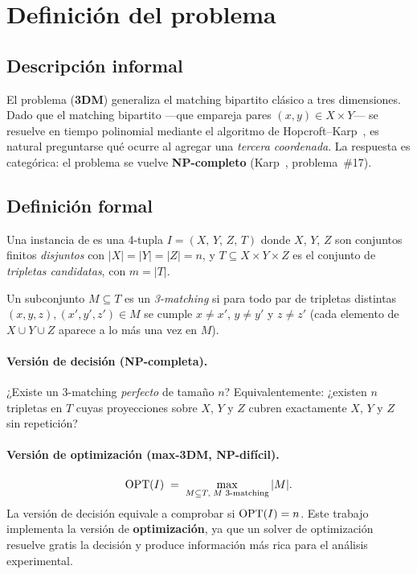 \section{Definición del problema}
\label{sec:problema}

\subsection{Descripción informal}
\label{sec:problema:informal}

El problema \threedm{} (\textbf{3DM}) generaliza el matching bipartito clásico
a tres dimensiones.  Dado que el matching bipartito ---que empareja pares
$(x,y)\in X\times Y$--- se resuelve en tiempo polinomial mediante el algoritmo
de Hopcroft--Karp~\cite{hopcroft1973}, es natural preguntarse qu\'e ocurre al
agregar una \emph{tercera coordenada}.  La respuesta es categ\'orica: el
problema se vuelve \textbf{NP-completo} (Karp~\cite{karp1972}, problema~\#17).

\subsection{Definición formal}
\label{sec:problema:formal}

\begin{definition}[Instancia de 3DM]
Una instancia de \threedm{} es una 4-tupla
$I = (X,\,Y,\,Z,\,T)$
donde $X$, $Y$, $Z$ son conjuntos finitos \emph{disjuntos} con
$|X|=|Y|=|Z|=n$, y
$T \subseteq X\times Y\times Z$ es el conjunto de \emph{tripletas candidatas},
con $m = |T|$.
\end{definition}

\begin{definition}[3-matching]
Un subconjunto $M\subseteq T$ es un \emph{3-matching} si para todo par de
tripletas distintas $(x,y,z),(x',y',z')\in M$ se cumple
$x\neq x'$, $y\neq y'$ y $z\neq z'$
(cada elemento de $X\cup Y\cup Z$ aparece a lo más una vez en $M$).
\end{definition}

\paragraph{Versión de decisión (NP-completa).}
¿Existe un 3-matching \emph{perfecto} de tamaño $n$?
Equivalentemente: ¿existen $n$ tripletas en $T$ cuyas proyecciones sobre $X$,
$Y$ y $Z$ cubren exactamente $X$, $Y$ y $Z$ sin repetición?

\paragraph{Versión de optimización (max-3DM, NP-difícil).}
\[
  \operatorname{OPT}(I) \;=\; \max_{M\subseteq T,\;M\text{ 3-matching}} |M|.
\]
La versión de decisión equivale a comprobar si $\operatorname{OPT}(I)=n$.
Este trabajo implementa la versión de \textbf{optimización}, ya que un solver
de optimización resuelve gratis la decisión y produce información más rica para
el análisis experimental.

